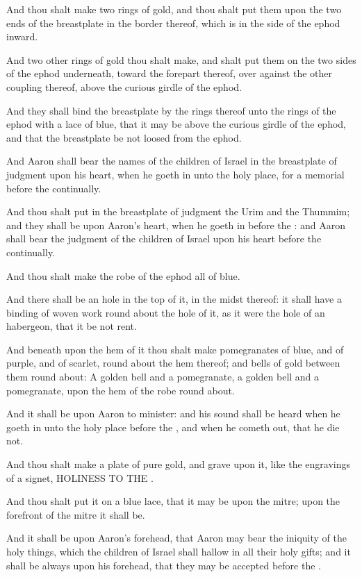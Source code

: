 \verse And thou shalt make two rings of gold, and thou shalt put them
upon the two ends of the breastplate in the border thereof, which is
in the side of the ephod inward.

\verse And two other rings of gold thou shalt make, and shalt put them
on the two sides of the ephod underneath, toward the forepart thereof,
over against the other coupling thereof, above the curious girdle of
the ephod.

\verse And they shall bind the breastplate by the rings thereof unto
the rings of the ephod with a lace of blue, that it may be above the
curious girdle of the ephod, and that the breastplate be not loosed
from the ephod.

\verse And Aaron shall bear the names of the children of Israel in the
breastplate of judgment upon his heart, when he goeth in unto the holy
place, for a memorial before the \LORD continually.

\verse And thou shalt put in the breastplate of judgment the Urim and
the Thummim; and they shall be upon Aaron's heart, when he goeth in
before the \LORD: and Aaron shall bear the judgment of the children of
Israel upon his heart before the \LORD continually.

\verse And thou shalt make the robe of the ephod all of blue.

\verse And there shall be an hole in the top of it, in the midst
thereof: it shall have a binding of woven work round about the hole of
it, as it were the hole of an habergeon, that it be not rent.

\verse And beneath upon the hem of it thou shalt make pomegranates of
blue, and of purple, and of scarlet, round about the hem thereof; and
bells of gold between them round about: \verse A golden bell and a
pomegranate, a golden bell and a pomegranate, upon the hem of the robe
round about.

\verse And it shall be upon Aaron to minister: and his sound shall be
heard when he goeth in unto the holy place before the \LORD, and when
he cometh out, that he die not.

\verse And thou shalt make a plate of pure gold, and grave upon it,
like the engravings of a signet, HOLINESS TO THE \LORD.

\verse And thou shalt put it on a blue lace, that it may be upon the
mitre; upon the forefront of the mitre it shall be.

\verse And it shall be upon Aaron's forehead, that Aaron may bear the
iniquity of the holy things, which the children of Israel shall hallow
in all their holy gifts; and it shall be always upon his forehead,
that they may be accepted before the \LORD.

